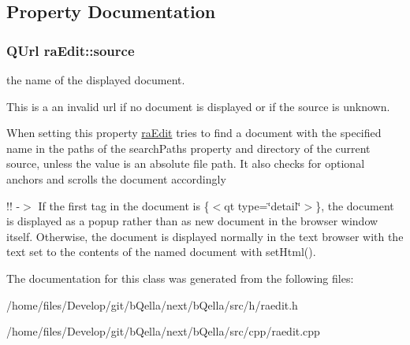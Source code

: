 \subsection{Property Documentation}
\hypertarget{classraEdit_a1609b3812b97d26b500990cb2801c0f1}{
\subsubsection[{source}]{\setlength{\rightskip}{0pt plus 5cm}QUrl raEdit::source}}
\label{classraEdit_a1609b3812b97d26b500990cb2801c0f1}


the name of the displayed document. 

This is a an invalid url if no document is displayed or if the source is unknown.

When setting this property \hyperlink{classraEdit}{raEdit} tries to find a document with the specified name in the paths of the searchPaths property and directory of the current source, unless the value is an absolute file path. It also checks for optional anchors and scrolls the document accordingly

!! -\/$>$ If the first tag in the document is {\ttfamily }\{$<$qt type=\char`\"{}detail\char`\"{}$>$\}, the document is displayed as a popup rather than as new document in the browser window itself. Otherwise, the document is displayed normally in the text browser with the text set to the contents of the named document with setHtml(). 

The documentation for this class was generated from the following files:\begin{DoxyCompactItemize}
\item 
/home/files/Develop/git/bQella/next/bQella/src/h/raedit.h\item 
/home/files/Develop/git/bQella/next/bQella/src/cpp/raedit.cpp\end{DoxyCompactItemize}
